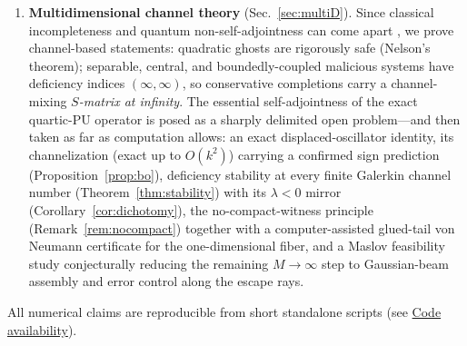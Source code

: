\documentclass[11pt]{article}
\theoremstyle{definition}
\theoremstyle{remark}
\begin{document}
\begin{enumerate}
  completions reflect probability off infinity at the classical round-trip
  time; the canonical object is the minimal, explosive, sub-stochastic
  process.
\item \textbf{Multidimensional channel theory}
  (Sec.~\ref{sec:multiD}). Since classical incompleteness and quantum
  non-self-adjointness can come apart \cite{RauchReed1973}, we
  prove channel-based statements: quadratic ghosts are rigorously safe
  (Nelson's theorem); separable, central, and boundedly-coupled malicious
  systems have deficiency indices $(\infty,\infty)$, so conservative
  completions carry a channel-mixing \emph{$S$-matrix at infinity}. The
  essential self-adjointness of the exact quartic-PU operator is posed as
  a sharply delimited open problem---and then taken as far as computation
  allows: an exact displaced-oscillator identity, its channelization
  (exact up to $O(k^{2})$) carrying a confirmed sign prediction
  (Proposition~\ref{prop:bo}), deficiency stability at every finite
  Galerkin channel number (Theorem~\ref{thm:stability}) with its $\lambda<0$
  mirror (Corollary~\ref{cor:dichotomy}), the no-compact-witness
  principle (Remark~\ref{rem:nocompact}) together with a computer-assisted
  glued-tail von Neumann certificate for the one-dimensional fiber, and a
  Maslov feasibility study conjecturally reducing the remaining
  $M\to\infty$ step to
  Gaussian-beam assembly and error control along the escape rays.
\end{enumerate}

All numerical claims are reproducible from short standalone scripts
(see \hyperref[sec:code]{Code availability}).
\end{document}
